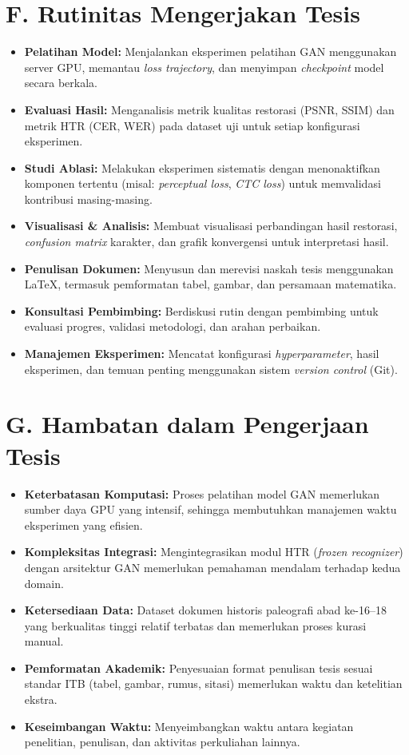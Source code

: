 \documentclass[a4paper,11pt]{article}
\begin{document}
\section*{F. Rutinitas Mengerjakan Tesis}
\begin{itemize}
    \item \textbf{Pelatihan Model:} Menjalankan eksperimen pelatihan GAN menggunakan server GPU, memantau \textit{loss trajectory}, dan menyimpan \textit{checkpoint} model secara berkala.
    \item \textbf{Evaluasi Hasil:} Menganalisis metrik kualitas restorasi (PSNR, SSIM) dan metrik HTR (CER, WER) pada dataset uji untuk setiap konfigurasi eksperimen.
    \item \textbf{Studi Ablasi:} Melakukan eksperimen sistematis dengan menonaktifkan komponen tertentu (misal: \textit{perceptual loss}, \textit{CTC loss}) untuk memvalidasi kontribusi masing-masing.
    \item \textbf{Visualisasi \& Analisis:} Membuat visualisasi perbandingan hasil restorasi, \textit{confusion matrix} karakter, dan grafik konvergensi untuk interpretasi hasil.
    \item \textbf{Penulisan Dokumen:} Menyusun dan merevisi naskah tesis menggunakan LaTeX, termasuk pemformatan tabel, gambar, dan persamaan matematika.
    \item \textbf{Konsultasi Pembimbing:} Berdiskusi rutin dengan pembimbing untuk evaluasi progres, validasi metodologi, dan arahan perbaikan.
    \item \textbf{Manajemen Eksperimen:} Mencatat konfigurasi \textit{hyperparameter}, hasil eksperimen, dan temuan penting menggunakan sistem \textit{version control} (Git).
\end{itemize}

\section*{G. Hambatan dalam Pengerjaan Tesis}
\begin{itemize}
    \item \textbf{Keterbatasan Komputasi:} Proses pelatihan model GAN memerlukan sumber daya GPU yang intensif, sehingga membutuhkan manajemen waktu eksperimen yang efisien.
    \item \textbf{Kompleksitas Integrasi:} Mengintegrasikan modul HTR (\textit{frozen recognizer}) dengan arsitektur GAN memerlukan pemahaman mendalam terhadap kedua domain.
    \item \textbf{Ketersediaan Data:} Dataset dokumen historis paleografi abad ke-16--18 yang berkualitas tinggi relatif terbatas dan memerlukan proses kurasi manual.
    \item \textbf{Pemformatan Akademik:} Penyesuaian format penulisan tesis sesuai standar ITB (tabel, gambar, rumus, sitasi) memerlukan waktu dan ketelitian ekstra.
    \item \textbf{Keseimbangan Waktu:} Menyeimbangkan waktu antara kegiatan penelitian, penulisan, dan aktivitas perkuliahan lainnya.
\end{itemize}
\end{document}
